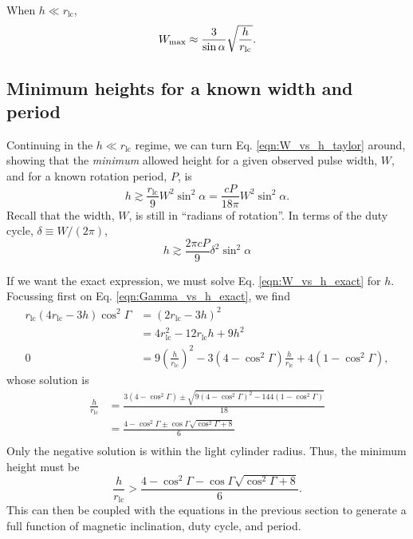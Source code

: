 \documentclass{book}
\newcommand{\rL}{r_\text{lc}} %
\newcommand{\dc}{\delta} %
\begin{document}
When $h \ll \rL$,
\begin{equation}
  W_{\rm max} \approx \frac{3}{\sin\alpha} \sqrt{\frac{h}{\rL}}.
  \label{eqn:W_vs_h_taylor}
\end{equation}

\subsection{Minimum heights for a known width and period}
\label{sec:min_height_ulp}

Continuing in the $h \ll \rL$ regime, we can turn Eq. \eqref{eqn:W_vs_h_taylor} around, showing that the \emph{minimum} allowed height for a given observed pulse width, $W$, and for a known rotation period, $P$, is
\begin{equation}
  h \gtrsim \frac{\rL}{9} W^2 \sin^2\alpha
    = \frac{cP}{18\pi} W^2 \sin^2\alpha.
\end{equation}
Recall that the width, $W$, is still in ``radians of rotation''.
In terms of the duty cycle, $\dc \equiv W/(2\pi)$,
\begin{equation}
  h \gtrsim \frac{2\pi cP}{9} \dc^2 \sin^2\alpha
\end{equation}

If we want the exact expression, we must solve Eq. \eqref{eqn:W_vs_h_exact} for $h$.
Focussing first on Eq. \eqref{eqn:Gamma_vs_h_exact}, we find
\begin{equation}
  \begin{aligned}
    \rL (4\rL - 3h) \cos^2\Gamma &= (2\rL - 3h)^2 \\
      &= 4\rL^2 - 12\rL h + 9h^2 \\
    0 &= 9\left(\frac{h}{\rL}\right)^2 - 3(4 - \cos^2\Gamma)\frac{h}{\rL} + 4(1 - \cos^2\Gamma),
  \end{aligned}
\end{equation}
whose solution is
\begin{equation}
  \begin{aligned}
    \frac{h}{\rL}
      &= \frac{3(4 - \cos^2\Gamma) \pm \sqrt{9(4 - \cos^2\Gamma)^2 - 144(1 - \cos^2\Gamma)}}{18} \\
      &= \frac{4 - \cos^2\Gamma \pm \cos\Gamma \sqrt{\cos^2\Gamma + 8}}{6} \\
  \end{aligned}
\end{equation}
Only the negative solution is within the light cylinder radius.
Thus, the minimum height must be
\begin{equation}
  \frac{h}{\rL} > \frac{4 - \cos^2\Gamma - \cos\Gamma \sqrt{\cos^2\Gamma + 8}}{6}.
\end{equation}
This can then be coupled with the equations in the previous section to generate a full function of magnetic inclination, duty cycle, and period.
\end{document}
